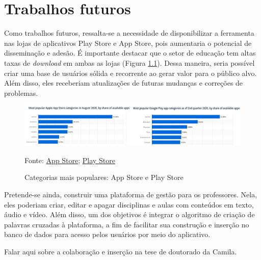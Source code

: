 \chapter{Trabalhos futuros} \label{sec:atividades_futuras}
Como trabalhos futuros, ressalta-se a necessidade de  disponibilizar a ferramenta nas lojas de aplicativos Play Store e App Store, pois aumentaria o potencial de disseminação e adesão. É importante destacar que o setor de educação tem altas taxas de \textit{download} em ambas as lojas (Figura \ref{fig:statista}). Dessa maneira, seria possível criar uma base de usuários sólida e recorrente ao gerar valor para o público alvo. Além disso, eles receberiam atualizações de futuras mudanças e correções de problemas.

\begin{figure}[H]
\centering
    \caption{Categorias mais populares: App Store e Play Store}
    \label{fig:statista}
    \includegraphics[width=1\textwidth]{Figuras/statista.png}
    
    Fonte: \href{https://www.statista.com/statistics/270291/popular-categories-in-the-app-store/}{App Store};  \href{https://www.statista.com/statistics/279286/google-play-android-app-categories/}{Play Store}
\end{figure}

Pretende-se ainda, construir uma plataforma de gestão para os professores. Nela, eles poderiam criar, editar e apagar disciplinas e aulas com conteúdos em texto, áudio e vídeo. Além disso, um dos objetivos é integrar o algoritmo de criação de palavras cruzadas à plataforma, a fim de facilitar sua construção e inserção no banco de dados para acesso pelos usuários por meio do aplicativo.

Falar aqui sobre a colaboração e inserção na tese de doutorado da Camila.


    
